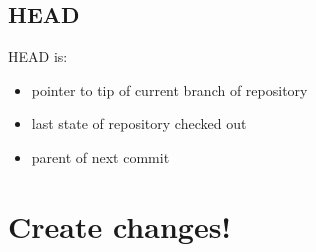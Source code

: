 \documentclass[a4paper,10pt]{article}
\newenvironment{Shaded}{}{}
\newcommand{\KeywordTok}[1]{\textcolor[rgb]{0.00,0.44,0.13}{\textbf{{#1}}}}
\newcommand{\CommentTok}[1]{\textcolor[rgb]{0.38,0.63,0.69}{\textit{{#1}}}}
\newcommand{\NormalTok}[1]{{#1}}
\begin{document}
\subsection{HEAD}\label{head}

HEAD is:

\begin{itemize}
\itemsep1pt\parskip0pt
\item
  pointer to tip of current branch of repository
\item
  last state of repository checked out
\item
  parent of next commit
\end{itemize}

\begin{Shaded}
\end{Shaded}

\section{Create changes!}\label{create-changes}
\end{document}
